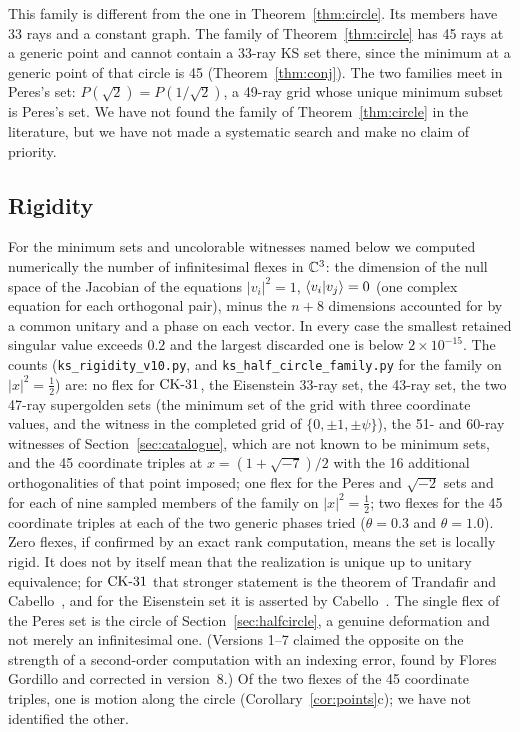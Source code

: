 This family is different from the one in Theorem~\ref{thm:circle}.  Its members have 33 rays
and a constant graph.  The family of Theorem~\ref{thm:circle} has 45 rays at a generic point and
cannot contain a 33-ray KS set there, since the minimum at a generic point of that circle is 45
(Theorem~\ref{thm:conj}).  The two families meet in Peres's set: $P(\sqrt2)=P(1/\sqrt2)$, a
49-ray grid whose unique minimum subset is Peres's set.  We
have not found the family of Theorem~\ref{thm:circle} in the literature, but we have not made a
systematic search and make no claim of priority.

\subsection{Rigidity}\label{sec:rigidity}

For the minimum sets and uncolorable witnesses named below we computed numerically the number
of infinitesimal flexes in $\mathbb{C}^3$: the
dimension of the null space of the Jacobian of the equations $|v_i|^2=1$,
$\langle v_i|v_j\rangle=0$ (one complex equation for each orthogonal pair), minus the $n+8$
dimensions accounted for by a common unitary and a phase on each vector.  In every case the
smallest retained singular value exceeds $0.2$ and the largest discarded one is below
$2\times10^{-15}$.  The counts (\texttt{ks\_rigidity\_v10.py}, and
\texttt{ks\_half\_circle\_family.py} for the family on $|x|^2=\tfrac12$) are: no flex for $\mathrm{CK}\text{-}31$,
the Eisenstein 33-ray set, the 43-ray set, the two 47-ray supergolden sets (the minimum set of
the grid with three coordinate values, and the witness in the completed grid of $\{0,\pm1,\pm\psi\}$), the
51- and 60-ray witnesses of Section~\ref{sec:catalogue}, which are not known to be minimum sets,
and the 45 coordinate triples at $x=(1+\sqrt{-7})/2$ with the 16 additional
orthogonalities of that point imposed; one flex for the Peres and $\sqrt{-2}$ sets and for each
of nine sampled members of the family on $|x|^2=\tfrac12$; two flexes for the 45 coordinate triples at each
of the two generic phases tried ($\theta=0.3$ and $\theta=1.0$).  Zero flexes, if confirmed by
an exact rank computation, means the set is locally rigid.  It does not by itself mean that the
realization is unique up to unitary equivalence; for $\mathrm{CK}\text{-}31$ that stronger statement is the
theorem of Trandafir and Cabello~\cite{TrandafirCabello2025}, and for the Eisenstein set it is
asserted by Cabello~\cite{Cabello2025simplest}.  The single flex of the Peres set is the circle
of Section~\ref{sec:halfcircle}, a genuine deformation and not merely an infinitesimal one.
(Versions 1--7 claimed the opposite on the strength of a second-order computation with an
indexing error, found by Flores Gordillo and corrected in version~8.)  Of the two flexes of the
45 coordinate triples, one is motion along the circle (Corollary~\ref{cor:points}c); we have not identified
the other.
